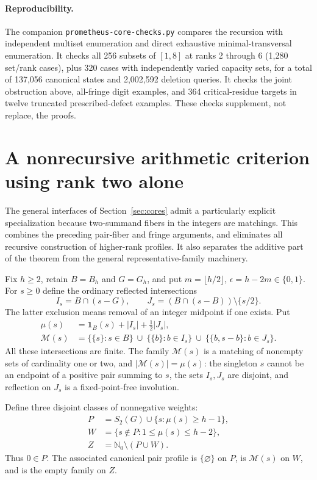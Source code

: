 \documentclass[11pt]{article}
\theoremstyle{remark}\newtheorem{remark}[theorem]{Remark}
\newcommand{\N}{\mathbb N_0}
\begin{document}
\paragraph{Reproducibility.} The companion \texttt{prometheus-core-checks.py} compares the recursion with independent multiset enumeration and direct exhaustive minimal-transversal enumeration. It checks all 256 subsets of $[1,8]$ at ranks 2 through 6 (1,280 set/rank cases), plus 320 cases with independently varied capacity sets, for a total of 137,056 canonical states and 2,002,592 deletion queries. It checks the joint obstruction above, all-fringe digit examples, and 364 critical-residue targets in twelve truncated prescribed-defect examples. These checks supplement, not replace, the proofs.

\section{A nonrecursive arithmetic criterion using rank two alone}\label{sec:pairdirect}
The general interfaces of Section~\ref{sec:cores} admit a particularly explicit specialization because two-summand fibers in the integers are matchings. This combines the preceding pair-fiber and fringe arguments, and eliminates all recursive construction of higher-rank profiles. It also separates the additive part of the theorem from the general representative-family machinery.

Fix $h\ge2$, retain $B=B_h$ and $G=G_h$, and put $m=\lfloor h/2\rfloor$, $\epsilon=h-2m\in\{0,1\}$. For $s\ge0$ define the ordinary reflected intersections
\[
 I_s=B\cap(s-G),\qquad J_s=(B\cap(s-B))\setminus\{s/2\}.
\]
The latter exclusion means removal of an integer midpoint if one exists. Put
\begin{align*}
 \mu(s)&=\mathbf 1_B(s)+|I_s|+\tfrac12|J_s|,\\
 \mathcal M(s)&=\{\{s\}:s\in B\}\ \cup\ \{\{b\}:b\in I_s\}\ \cup\ \{\{b,s-b\}:b\in J_s\}.
\end{align*}
All these intersections are finite. The family $\mathcal M(s)$ is a matching of nonempty sets of cardinality one or two, and $|\mathcal M(s)|=\mu(s)$: the singleton $s$ cannot be an endpoint of a positive pair summing to $s$, the sets $I_s,J_s$ are disjoint, and reflection on $J_s$ is a fixed-point-free involution.

Define three disjoint classes of nonnegative weights:
\begin{align*}
 P&=S_2(G)\cup\{s:\mu(s)\ge h-1\},\\
 W&=\{s\notin P:1\le\mu(s)\le h-2\},\\
 Z&=\N\setminus(P\cup W).
\end{align*}
Thus $0\in P$. The associated canonical pair profile is $\{\varnothing\}$ on $P$, is $\mathcal M(s)$ on $W$, and is the empty family on $Z$.
\end{document}
